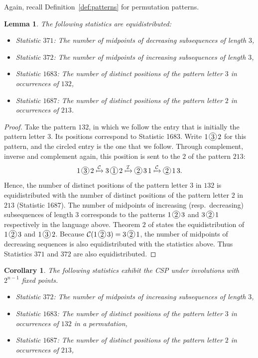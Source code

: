 \documentclass{amsart}
\newtheorem{lem}[thm]{Lemma}
\newtheorem{cor}[thm]{Corollary}
\theoremstyle{definition}
\newcommand{\circlesign}[1]{
\begin{tikzpicture}[baseline=(X.base), inner sep=1]
    \node[draw,circle] (X)  {\ensuremath{#1}};
\end{tikzpicture}
}
\newcommand{\C}{\mathcal{C}} %
\begin{document}
Again, recall Definition~\ref{def:patterns} for permutation patterns.
\begin{lem}\label{lem:equid_371}
  The following statistics are equidistributed:
  \begin{itemize}
    \item  Statistic $371$: The number of midpoints of decreasing subsequences of length $3$,
    \item Statistic $372$: The number of midpoints of increasing subsequences of length $3$,
    \item  Statistic $1683$: The number of distinct positions of the pattern letter $3$ in occurrences of $132$,
    \item Statistic $1687$: The number of distinct positions of the pattern letter $2$ in occurrences of $213$.
  \end{itemize}
\end{lem}
\begin{proof}
  Take the pattern $132$, in which we follow the entry that is initially the pattern letter $3$. Its positions correspond to Statistic 1683. Write $1\,\circlesign{3}\,2$ for this pattern, and the circled entry is the one that we follow. Through complement, inverse and complement again, this position is sent to the $2$ of the pattern $213$:
  \[ 1\,\circlesign{3}\,2 \xmapsto{\mathcal{C}} 3\,\circlesign{1}\,2 \xmapsto{\mathcal{I}} \circlesign{2}\,3\,1 \xmapsto{\mathcal{C}} \circlesign{2}\,1\,3.\]
  Hence, the number of distinct positions of the pattern letter $3$ in $132$ is equidistributed with the number of distinct positions of the pattern letter $2$ in $213$ (Statistic 1687).
  The number of midpoints of increasing (resp.\ decreasing) subsequences of length $3$ corresponds to the patterns $1\,\circlesign{2}\,{3}$ and $3\,\circlesign{2}\,{1}$ respectively in the language above. Theorem $2$ of \cite{ThamrongpairojRemmel} states the equidistribution of $1\,\circlesign{2}\,{3}$ and $1\,\circlesign{3}\,{2}$. Because $\C(1\,\circlesign{2}\,{3}) = 3\,\circlesign{2}\,{1}$, the number of midpoints of decreasing sequences is also equidistributed with the statistics above. Thus Statistics $371$ and $372$ are also equidistributed.
\end{proof}


\begin{cor}\label{cor:Corteel_mid_decreasing}
  The following statistics exhibit the CSP under involutions with $2^{n-1}$ fixed points.
  \begin{itemize}
    \item Statistic $372$: The number of midpoints of increasing subsequences of length $3$,
    \item  Statistic $1683$: The number of distinct positions of the pattern letter $3$ in occurrences of $132$ in a permutation,
    \item Statistic $1687$: The number of distinct positions of the pattern letter $2$ in occurrences of $213$,
  \end{itemize}
\end{cor}
\end{document}
